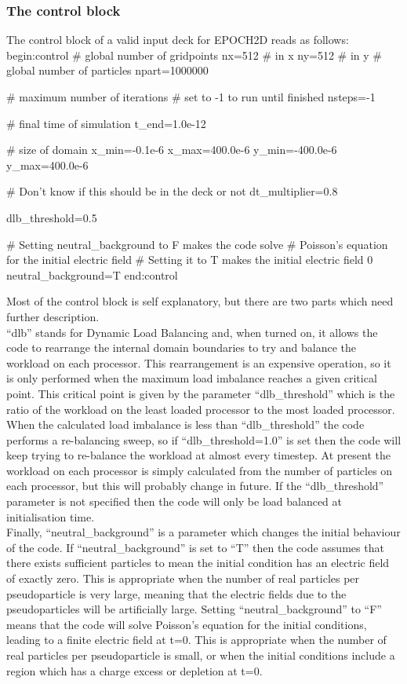 \documentclass[12pt,a4paper]{article}
\newenvironment{boxverbatim}{\lboxverbatim{none}}{\endlboxverbatim}
\begin{document}
\subsubsection{The control block}
The control block of a valid input deck for EPOCH2D reads as follows:
\begin{boxverbatim}
begin:control
   # global number of gridpoints
   nx=512 # in x
   ny=512 # in y
   # global number of particles
   npart=1000000

   # maximum number of iterations
   # set to -1 to run until finished
   nsteps=-1

   # final time of simulation
   t_end=1.0e-12

   # size of domain
   x_min=-0.1e-6
   x_max=400.0e-6
   y_min=-400.0e-6
   y_max=400.0e-6

   # Don't know if this should be in the deck or not
   dt_multiplier=0.8

   dlb_threshold=0.5

   # Setting neutral_background to F makes the code solve
   # Poisson's equation for the initial electric field
   # Setting it to T makes the initial electric field 0
   neutral_background=T
end:control
\end{boxverbatim}

Most of the control block is self explanatory, but there are two parts which
need further description. \\
``dlb'' stands for Dynamic Load Balancing and, when turned on, it allows the
code to rearrange the internal domain boundaries to try and balance the
workload on each processor. This rearrangement is an expensive operation, so
it is only performed when the maximum load imbalance reaches a given critical
point. This critical point is given by the parameter ``dlb\_threshold'' which
is the ratio of the workload on the least loaded processor to the most loaded
processor. When the calculated load imbalance is less than ``dlb\_threshold''
the code performs a re-balancing sweep, so if ``dlb\_threshold=1.0'' is set
then the code will keep trying to re-balance the workload at almost every
timestep. At present the workload on each processor is simply calculated from
the number of particles on each processor, but this will probably change in
future. If the ``dlb\_threshold'' parameter is not specified then the code
will only be load balanced at initialisation time.\\

Finally, ``neutral\_background'' is a parameter which changes the initial
behaviour of the code. If ``neutral\_background'' is set to ``T'' then the code
assumes that there exists sufficient particles to mean the initial condition
has an electric field of exactly zero. This is appropriate when the number of
real particles per pseudoparticle is very large, meaning that the electric
fields due to the pseudoparticles will be artificially large. Setting
``neutral\_background'' to ``F'' means that the code will solve Poisson's
equation for the initial conditions, leading to a finite electric field at
t=0. This is appropriate when the number of real particles per pseudoparticle
is small, or when the initial conditions include a region which has a charge
excess or depletion at t=0.\\
\end{document}
